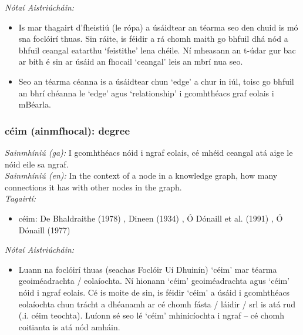  \noindent \textit{Nótaí Aistriúcháin:}
\begin{itemize}
	\item Is mar thagairt d'fheistiú (le rópa) a úsáidtear an téarma seo den chuid is mó sna foclóirí thuas. Sin ráite, is féidir a rá chomh maith go bhfuil dhá nód a bhfuil ceangal eatarthu `feistithe' lena chéile. Ní mheasann an t-údar gur bac ar bith é sin ar úsáid an fhocail `ceangal' leis an mbrí nua seo.
	\item Seo an téarma céanna is a úsáidtear chun `edge' a chur in iúl, toisc go bhfuil an bhrí chéanna le `edge' agus `relationship' i gcomhthéacs graf eolais i mBéarla.
\end{itemize}


\subsubsection*{céim (ainmfhocal): degree}
 \noindent \textit{Sainmhíniú (ga):} I gcomhthéacs nóid i ngraf eolais, cé mhéid ceangal atá aige le nóid eile sa ngraf.
\\
 \noindent \textit{Sainmhíniú (en):} In the context of a node in a knowledge graph, how many connections it has with other nodes in the graph.
\\
 \noindent \textit{Tagairtí:}
\begin{itemize}
	\item céim: De Bhaldraithe (1978) \cite{de-bhaldraithe}, Dineen (1934) \cite{dineen}, Ó Dónaill et al. (1991) \cite{focloir-beag}, Ó Dónaill (1977) \cite{odonaill}
\end{itemize}

 \noindent \textit{Nótaí Aistriúcháin:}
\begin{itemize}
	\item Luann na foclóirí thuas (seachas Foclóir Uí Dhuinín) `céim' mar téarma geoiméadrachta / eolaíochta. Ní hionann `céim' geoiméadrachta agus `céim' nóid i ngraf eolais. Cé is moite de sin, is féidir `céim' a úsáid i gcomhthéacs eolaíochta chun trácht a dhéanamh ar cé chomh fásta / láidir / srl is atá rud (.i. céim teochta). Luíonn sé seo lé `céim' mhinicíochta i ngraf -- cé chomh coitianta is atá nód amháin.
\end{itemize}


